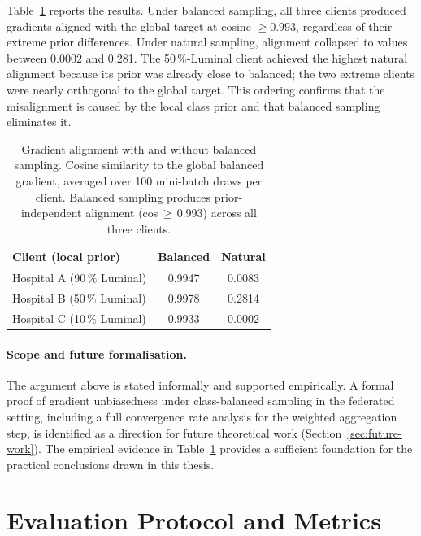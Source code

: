 Table~\ref{tab:theorem-verification} reports the results.
Under balanced sampling, all three clients produced
gradients aligned with the global target at cosine
$\geq 0.993$, regardless of their extreme prior
differences.
Under natural sampling, alignment collapsed to values
between 0.0002 and 0.281.
The 50\,\%-Luminal client achieved the highest natural
alignment because its prior was already close to balanced;
the two extreme clients were nearly orthogonal to the
global target.
This ordering confirms that the misalignment is caused
by the local class prior and that balanced sampling
eliminates it.

\begin{table}[htbp]
\centering
\caption{Gradient alignment with and without balanced
sampling. Cosine similarity to the global balanced
gradient, averaged over 100 mini-batch draws per client.
Balanced sampling produces prior-independent alignment
(cos\,$\geq$\,0.993) across all three clients.}
\label{tab:theorem-verification}
\begin{tabular}{lcc}
\toprule
Client (local prior) & Balanced & Natural \\
\midrule
Hospital A (90\,\% Luminal) & 0.9947 & 0.0083 \\
Hospital B (50\,\% Luminal) & 0.9978 & 0.2814 \\
Hospital C (10\,\% Luminal) & 0.9933 & 0.0002 \\
\bottomrule
\end{tabular}
\end{table}

\paragraph{Scope and future formalisation.}
The argument above is stated informally and supported
empirically.
A formal proof of gradient unbiasedness under
class-balanced sampling in the federated setting,
including a full convergence rate analysis for the
weighted aggregation step, is identified as a direction
for future theoretical work (Section~\ref{sec:future-work}).
The empirical evidence in Table~\ref{tab:theorem-verification}
provides a sufficient foundation for the practical
conclusions drawn in this thesis.
\section{Evaluation Protocol and Metrics}
\label{sec:eval-protocol}


